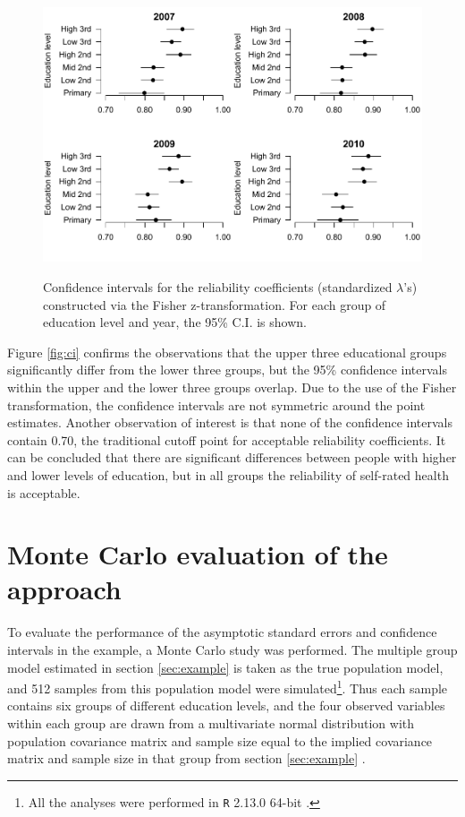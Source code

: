 \documentclass[a4paper,11pt]{article}
\renewcommand{\l}{\lambda}
\newcommand{\0}{\boldsymbol{0}}
\newcommand{\R}{\texttt{R} 2.13.0 64-bit \citep{R}\;}
\begin{document}
\begin{figure}[bth]
\begin{center}
\caption{Confidence intervals for the reliability coefficients (standardized $\l$'s) constructed via the Fisher z-transformation. For each group of  education level and year, the 95\% C.I. is shown.}\label{fig:ci}
\includegraphics[width=.99\textwidth]{CI}
\label{default}
\end{center}
\end{figure}

Figure \ref{fig:ci} confirms the observations that the upper three educational groups significantly differ from the lower three groups, but
the 95\% confidence intervals within the upper and the lower three groups overlap. Due to the use of the Fisher transformation, the
confidence intervals are not symmetric around the point estimates. Another observation of interest is that none of the confidence
intervals contain 0.70, the traditional cutoff point for acceptable reliability coefficients. It can be concluded that there
are significant differences between people with higher and lower levels of education, but in all groups the reliability of self-rated health
is acceptable.

\section{Monte Carlo evaluation of the approach\label{sec:montecarlo}}

To evaluate the performance of the asymptotic standard errors and confidence intervals in the example, 
a Monte Carlo study was performed.  The multiple group model estimated in section \ref{sec:example} is taken as the true 
population model, and 512 samples from this population model were simulated\footnote{All the analyses were
performed in \R.}. Thus each sample contains six groups of different education levels, and the four observed
variables within each group are drawn from a multivariate  normal distribution with population covariance
matrix and sample size equal to the implied covariance matrix and sample size in that group from section \ref{sec:example} . 
\end{document}
